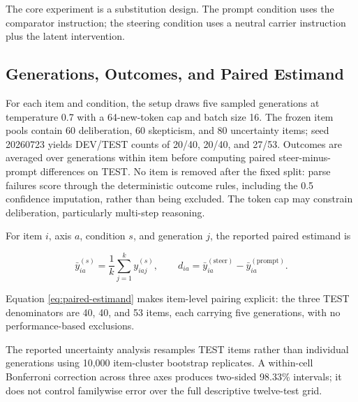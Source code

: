 \documentclass[manuscript,review,anonymous]{acmart}
\begin{document}
The core experiment is a substitution design. The prompt condition uses the comparator instruction; the steering condition uses a neutral carrier instruction plus the latent intervention. {}%
{}%

\subsection{Generations, Outcomes, and Paired Estimand}\label{generations-outcomes-and-paired-estimand}

For each item and condition, the setup draws five sampled generations at temperature 0.7 with a 64-new-token cap and batch size 16. {}%
The frozen item pools contain 60 deliberation, 60 skepticism, and 80 uncertainty items; seed 20260723 yields DEV/TEST counts of 20/40, 20/40, and 27/53. Outcomes are averaged over generations within item before computing paired steer-minus-prompt differences on TEST. {}%
No item is removed after the fixed split: parse failures score through the deterministic outcome rules, including the 0.5 confidence imputation, rather than being excluded. The token cap may constrain deliberation, particularly multi-step reasoning. {}%

For item \(i\), axis \(a\), condition \(s\), and generation \(j\), the reported paired estimand is

\begin{equation}
\bar y^{(s)}_{ia}=\frac{1}{k}\sum_{j=1}^{k}y^{(s)}_{iaj},\qquad
d_{ia}=\bar y^{(\mathrm{steer})}_{ia}-\bar y^{(\mathrm{prompt})}_{ia}.
\label{eq:paired-estimand}
\end{equation}


Equation \ref{eq:paired-estimand} makes item-level pairing explicit: the three TEST denominators are 40, 40, and 53 items, each carrying five generations, with no performance-based exclusions.

The reported uncertainty analysis resamples TEST items rather than individual generations using 10,000 item-cluster bootstrap replicates. {}%
A within-cell Bonferroni correction across three axes produces two-sided 98.33\% intervals; it does not control familywise error over the full descriptive twelve-test grid. {}%
{}%
\end{document}
